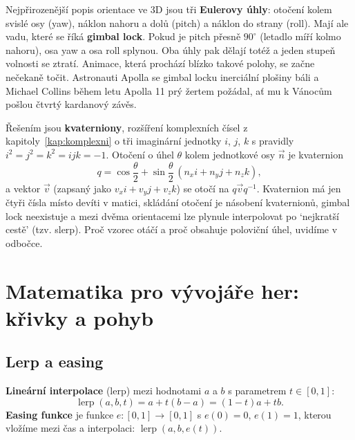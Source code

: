 Nejpřirozenější popis orientace ve 3D jsou tři \textbf{Eulerovy úhly}: otočení kolem svislé osy (yaw), náklon nahoru a dolů (pitch) a náklon do strany (roll). Mají ale vadu, které se říká \textbf{gimbal lock}. Pokud je pitch přesně $90^\circ$ (letadlo míří kolmo nahoru), osa yaw a osa roll splynou. Oba úhly pak dělají totéž a jeden stupeň volnosti se ztratí. Animace, která prochází blízko takové polohy, se začne nečekaně točit. Astronauti Apolla se gimbal locku inerciální plošiny báli a Michael Collins během letu Apolla 11 prý žertem požádal, ať mu k Vánocům pošlou čtvrtý kardanový závěs.

Řešením jsou \textbf{kvaterniony}, rozšíření komplexních čísel z kapitoly~\ref{kap:komplexni} o tři imaginární jednotky $i$, $j$, $k$ s pravidly $i^2 = j^2 = k^2 = ijk = -1$. Otočení o úhel $\theta$ kolem jednotkové osy $\vec{n}$ je kvaternion
\begin{equation*}
  q = \cos\frac{\theta}{2} + \sin\frac{\theta}{2}\,(n_xi + n_yj + n_zk),
\end{equation*}
a vektor $\vec{v}$ (zapsaný jako $v_xi + v_yj + v_zk$) se otočí na $q\vec{v}q^{-1}$. Kvaternion má jen čtyři čísla místo devíti v matici, skládání otočení je násobení kvaternionů, gimbal lock neexistuje a mezi dvěma orientacemi lze plynule interpolovat po `nejkratší cestě' (tzv. slerp). Proč vzorec otáčí a proč obsahuje poloviční úhel, uvidíme v odbočce.

\section{Matematika pro vývojáře her: křivky a pohyb}

\subsection{Lerp a easing}

\begin{definitionbox}
  \textbf{Lineární interpolace} (lerp) mezi hodnotami $a$ a $b$ s parametrem $t\in[0, 1]$:
  \begin{equation*}
    \operatorname{lerp}(a, b, t) = a + t(b - a) = (1 - t)a + tb.
  \end{equation*}
  \textbf{Easing funkce} je funkce $e\colon[0, 1]\to[0, 1]$ s $e(0) = 0$, $e(1) = 1$, kterou vložíme mezi čas a interpolaci: $\operatorname{lerp}(a, b, e(t))$.
\end{definitionbox}

